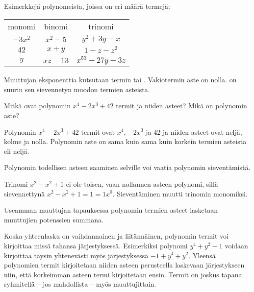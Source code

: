 \begin{esimerkki}
Esimerkkejä polynomeista, joissa on eri määrä termejä:
\begin{center}\begin{tabular}{ccc}
monomi	& binomi 	&	trinomi \\
$-3x^2$   & $x^2-5$	& $y^2+3y-x$ \\
$42$		& $x+y$ 	& $1-z-z^2$ \\
$y$		& $xz-13$ 	& $x^{53}-27y-3z$ \\
 \end{tabular} \end{center}
 \end{esimerkki}

Muuttujan eksponenttia kutsutaan termin  tai . Vakiotermin aste on nolla.  on suurin sen sievennetyn muodon termien asteista.

\begin{esimerkki}
    Mitkä ovat polynomin $x^4-2x^3+42$ termit ja niiden asteet? Mikä on polynomin aste?
    \begin{esimvast}
        Polynomin $x^4-2x^3+42$ termit ovat $x^4$, $-2x^3$ ja $42$ ja niiden asteet ovat neljä, kolme ja nolla. Polynomin aste on sama kuin sama kuin korkein termien asteista eli neljä.
    \end{esimvast}
\end{esimerkki}

Polynomin todellisen asteen saaminen selville voi vaatia polynomin sieventämistä.

\begin{esimerkki}
Trinomi $x^2-x^2+1$ ei ole toisen, vaan nollannen asteen polynomi, sillä sievennettynä $x^2-x^2+1=1=1x^0$. Sieventäminen muutti trinomin monomiksi.
\end{esimerkki}

Useamman muuttujan tapauksessa polynomin termien asteet lasketaan muuttujien potenssien summana.

\begin{esimerkki}
\end{esimerkki}

Koska yhteenlasku on vaihdannainen ja liitännäinen, polynomin termit voi kirjoittaa missä tahansa järjestyksessä. Esimerkiksi polynomi $y^4+y^2-1$ voidaan kirjoittaa täysin yhtenevästi myös järjestyksessä $-1+y^4+y^2$. Yleensä polynomien termit kirjoitetaan niiden asteen perusteella laskevaan järjestykseen niin, että korkeimman asteen termi kirjoitetaan ensin. Termit on joskus tapana ryhmitellä -- jos mahdollista -- myös muuttujittain.

